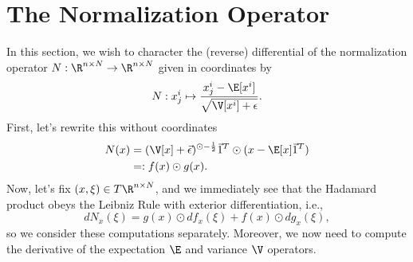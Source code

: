 


\section{The Normalization Operator}\label{sec:normOp}



In this section, we wish to character the (reverse) differential of the normalization operator $N:\R^{n\times N}\to\R^{n\times N}$ given in coordinates by
$$N:x^i_j\mapsto \frac{x^i_j-\E[x^i]}{\sqrt{\V[x^i]+\epsilon}}.$$
First, let's rewrite this without coordinates
\begin{align*}
	N(x)&=(\V[x]+\vec{\epsilon})^{\odot-\frac{1}{2}}\vec{1}^T\odot(x-\E[x]\vec{1}^T)\\
	&=:f(x)\odot g(x).
\end{align*}
Now, let's fix $(x,\xi)\in T\R^{n\times N}$, and we immediately see that the Hadamard product obeys the Leibniz Rule with exterior differentiation, i.e.,
$$dN_x(\xi)=g(x)\odot df_x(\xi)+f(x)\odot dg_x(\xi),$$
so we consider these computations separately.  Moreover, we now need to compute the derivative of the expectation $\E$ and variance $\V$ operators.

